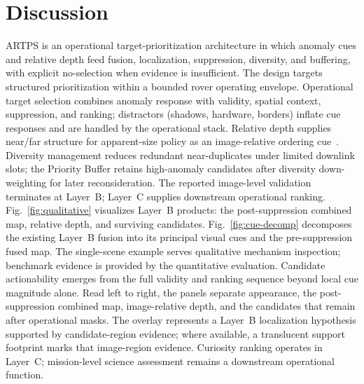 \FloatBarrier
\section{Discussion}
\label{sec:discussion}
ARTPS is an operational target-prioritization architecture in which anomaly cues and relative
depth feed fusion, localization, suppression, diversity, and buffering, with explicit
no-selection when evidence is insufficient.
The design targets structured prioritization within a bounded rover operating envelope.
Operational target selection combines anomaly response with validity, spatial context,
suppression, and ranking; distractors (shadows, hardware, borders) inflate cue responses and
are handled by the operational stack.
Relative depth supplies near/far structure for apparent-size policy as an image-relative
ordering cue~\citep{ranftl2021dpt}.
Diversity management reduces redundant near-duplicates under limited downlink slots;
the Priority Buffer retains high-anomaly candidates after diversity down-weighting for later
reconsideration.
The reported image-level validation terminates at Layer~B; Layer~C supplies downstream
operational ranking.
Fig.~\ref{fig:qualitative} visualizes Layer~B products: the post-suppression combined map,
relative depth, and surviving candidates.
Fig.~\ref{fig:cue-decomp} decomposes the existing Layer~B fusion into its principal visual
cues and the pre-suppression fused map.
The single-scene example serves qualitative mechanism inspection; benchmark evidence is
provided by the quantitative evaluation.
Candidate actionability emerges from the full validity and ranking sequence beyond local
cue magnitude alone.
Read left to right, the panels separate appearance, the post-suppression combined map,
image-relative depth, and the candidates that remain after operational masks.
The overlay represents a Layer~B localization hypothesis supported by candidate-region
evidence; where available, a translucent support footprint marks that image-region evidence.
Curiosity ranking operates in Layer~C; mission-level science assessment remains a
downstream operational function.


